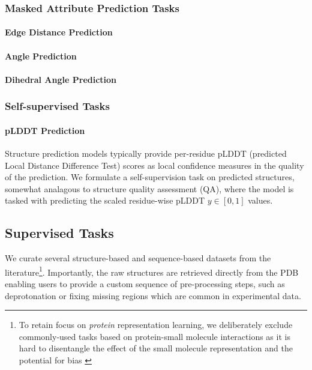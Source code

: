 \subsubsection{Masked Attribute Prediction Tasks}


\paragraph{Edge Distance Prediction}


\paragraph{Angle Prediction}

\paragraph{Dihedral Angle Prediction}


\subsubsection{Self-supervised Tasks}
\paragraph{pLDDT Prediction}
Structure prediction models typically provide per-residue pLDDT (predicted Local Distance Difference Test) scores as local confidence measures in the quality of the prediction. We formulate a self-supervision task on predicted structures, somewhat analagous to structure quality assessment (QA), where the model is tasked with predicting the scaled residue-wise pLDDT $y \in [0, 1]$ values.



\subsection{Supervised Tasks}
We curate several structure-based and sequence-based datasets from the literature\footnote{To retain focus on \emph{protein} representation learning, we deliberately exclude commonly-used tasks based on protein-small molecule interactions as it is hard to disentangle the effect of the small molecule representation and the potential for bias \cite{Boyles2019}}. Importantly, the raw structures are retrieved directly from the PDB enabling users to provide a custom sequence of pre-processing steps, such as deprotonation or fixing missing regions which are common in experimental data.

